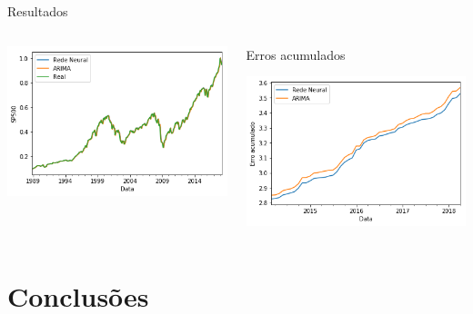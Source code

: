 \documentclass[compress,aspectratio=149,brazil]{beamer}
\begin{document}
\begin{frame}{Resultados}
    \begin{columns}
        \begin{column}{.5\textwidth}
            \includegraphics[width=\textwidth]{../images/sp500_prediction_compare.png}
        \end{column}
        \begin{column}{.5\textwidth}
            \begin{block}{Erros acumulados}
                \begin{center}
                    \includegraphics[width=.8\textwidth]{../images/sp500_cumsum.png}
                \end{center}
            \end{block}
        \end{column}
    \end{columns}
\end{frame}

\section{Conclusões}
\end{document}
